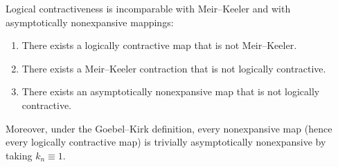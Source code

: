 \documentclass[10pt,a4paper]{amsart}
\begin{document}
\begin{proposition}\label{prop:incomparability}
Logical contractiveness is incomparable with Meir--Keeler and with asymptotically nonexpansive mappings:
\begin{enumerate}
\item There exists a logically contractive map that is not Meir--Keeler.
\item There exists a Meir--Keeler contraction that is not logically contractive.
\item There exists an asymptotically nonexpansive map that is not logically contractive.
\end{enumerate}
Moreover, under the Goebel--Kirk definition, every nonexpansive map (hence every logically contractive map) is trivially asymptotically nonexpansive by taking $k_n\equiv 1$.
\end{proposition}
\end{document}
